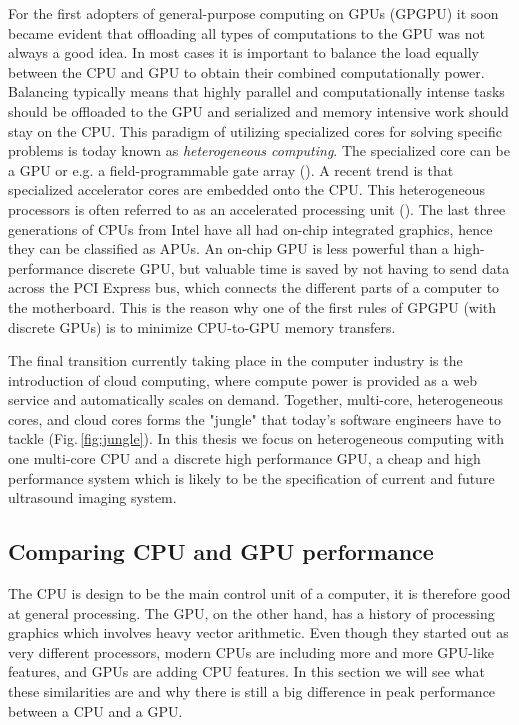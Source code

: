 For the first adopters of general-purpose computing on GPUs (GPGPU) it soon became evident that offloading all types of computations to the GPU was not always a good idea. In most cases it is important to balance the load equally between the CPU and GPU to obtain their combined computationally power. Balancing typically means that highly parallel and computationally intense tasks should be offloaded to the GPU and serialized and memory intensive work should stay on the CPU. This paradigm of utilizing specialized cores for solving specific problems is today known as \textit{heterogeneous computing}. The specialized core can be a GPU or e.g. a field-programmable gate array (). A recent trend is that specialized accelerator cores are embedded onto the CPU. This heterogeneous processors is often referred to as an accelerated processing unit (). The last three generations of CPUs from Intel have all had on-chip integrated graphics, hence they can be classified as APUs. An on-chip GPU is less powerful than a high-performance discrete GPU, but valuable time is saved by not having to send data across the PCI Express bus, which connects the different parts of a computer to the motherboard. This is the reason why one of the first rules of GPGPU (with discrete GPUs) is to minimize CPU-to-GPU memory transfers. 

The final transition currently taking place in the computer industry is the introduction of cloud computing, where compute power is provided as a web service and automatically scales on demand. Together, multi-core, heterogeneous cores, and cloud cores forms the "jungle" that today's software engineers have to tackle (Fig.\,\ref{fig:jungle}). In this thesis we focus on heterogeneous computing with one multi-core CPU and a discrete high performance GPU, a cheap and high performance system which is likely to be the specification of current and future ultrasound imaging system.

\subsection{Comparing CPU and GPU performance}\label{sec:cpu_vs_gpu}
The CPU is design to be the main control unit of a computer, it is therefore good at general processing. The GPU, on the other hand, has a history of processing graphics which involves heavy vector arithmetic. Even though they started out as very different processors, modern CPUs are including more and more GPU-like features, and GPUs are adding CPU features. In this section we will see what these similarities are and why there is still a big difference in peak performance between a CPU and a GPU.

